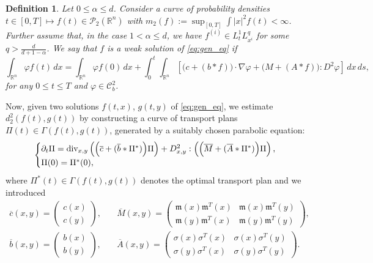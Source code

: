 \documentclass[10pt,oneside]{amsart}
\numberwithin{equation}{section}
\newtheorem{definition}{Definition}
\numberwithin{definition}{section}
\numberwithin{theorem}{section}
\numberwithin{lemma}{section}
\begin{document}
% 
\begin{definition}
  Let $0\leq \alpha \leq d$. Consider a curve of probability densities $t\in [0,T]\mapsto f(t)\in \mathcal P_2(\mathbb R^n)$ with $m_2(f):=\sup_{[0,T]}\int|x|^2f(t)<\infty$. Further assume that, in the case $1 < \alpha \leq d$, we have $f^{(i)}\in L^1_tL^q_{x^i}$ for some $q>\frac{d}{d+1-\alpha}$. We say that $f$ is a weak solution of \eqref{eq:gen_eq} if 
  \begin{equation*}
    \int_{\mathbb{R}^{n}}\varphi f(t)\,dx=\int_{\mathbb{R}^{n}}\varphi f(0)\,dx+\int_{0}^{t}\int_{\mathbb{R}^{n}}\left[\Big(c+(b*f)\Big)\cdot\nabla\varphi+\Big(M+(A*f)\Big):D^{2}\varphi\right]\,dx\,ds,
  \end{equation*}
  for any $0\leq t\leq T$ and $\varphi\in \mathcal C^2_b$.
\end{definition}
% 
Now, given two solutions $f(t,x)$, $g(t,y)$ of \eqref{eq:gen_eq}, we estimate $d_2^2(f(t),g(t))$ by constructing a curve of transport plans $\Pi(t)\in \Gamma(f(t),g(t))$, generated by a suitably chosen parabolic equation:
%
\begin{equation}\label{eq:plan_eq}
  \begin{cases}
     \partial_t\Pi = \textnormal{div}_{x,y}\left(\Big(\overline{c}+(\overline{b}*\Pi^{*})\Big)\Pi\right) + 
  D^2_{x,y}:\left(\Big(\overline{M}+(\overline{A}*\Pi^{*})\Big)\Pi\right),
  \\ 
  \Pi(0) = \Pi^*(0),
  \end{cases}
\end{equation}
%
where $\Pi^*(t)\in \Gamma(f(t),g(t))$ denotes the optimal transport plan and we introduced
% 
\begin{align}
    \overline{c}(x,y)=\begin{pmatrix}c(x)\\c(y)\end{pmatrix}, &
    \quad\overline{M}(x,y)=\begin{pmatrix}\mathfrak m(x)\mathfrak m^{T}(x) & \mathfrak m(x)\mathfrak m^{T}(y)\\
    \mathfrak m(y)\mathfrak m^{T}(x) & \mathfrak m(y)\mathfrak m^{T}(y)\end{pmatrix},	\label{eq:bar_der}\\
    \overline{b}(x,y)=\begin{pmatrix}b(x)\\b(y)\end{pmatrix}, &
    \quad\overline{A}(x,y)=\begin{pmatrix}\sigma(x)\sigma^{T}(x) & \sigma(x)\sigma^{T}(y)\\
    \sigma(y)\sigma^{T}(x) & \sigma(y)\sigma^{T}(y)\end{pmatrix}.\label{eq:bar_der2}
\end{align}
\end{document}
